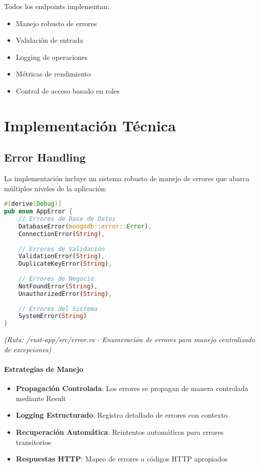 \documentclass[12pt,letterpaper]{article}
\begin{document}
Todos los endpoints implementan:
\begin{itemize}
    \item Manejo robusto de errores
    \item Validación de entrada
    \item Logging de operaciones
    \item Métricas de rendimiento
    \item Control de acceso basado en roles
\end{itemize}
\section{Implementación Técnica}
\subsection{Error Handling}
La implementación incluye un sistema robusto de manejo de errores que abarca múltiples niveles de la aplicación:

\begin{lstlisting}[language=rust]
#[derive(Debug)]
pub enum AppError {
    // Errores de Base de Datos
    DatabaseError(mongodb::error::Error),
    ConnectionError(String),
    
    // Errores de Validación
    ValidationError(String),
    DuplicateKeyError(String),
    
    // Errores de Negocio
    NotFoundError(String),
    UnauthorizedError(String),
    
    // Errores del Sistema
    SystemError(String)
}
\end{lstlisting}
\textit{(Ruta: /rust-app/src/error.rs - Enumeración de errores para manejo centralizado de excepciones)}

\paragraph{Estrategias de Manejo}
\begin{itemize}
    \item \textbf{Propagación Controlada}: Los errores se propagan de manera controlada mediante Result
    \item \textbf{Logging Estructurado}: Registro detallado de errores con contexto
    \item \textbf{Recuperación Automática}: Reintentos automáticos para errores transitorios
    \item \textbf{Respuestas HTTP}: Mapeo de errores a códigos HTTP apropiados
\end{itemize}
\end{document}
